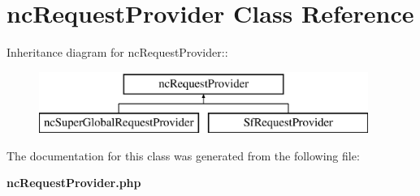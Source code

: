 \section{ncRequestProvider Class Reference}
\label{classncRequestProvider}
Inheritance diagram for ncRequestProvider::\begin{figure}[H]
\begin{center}
\leavevmode
\includegraphics[height=2cm]{classncRequestProvider}
\end{center}
\end{figure}


The documentation for this class was generated from the following file:\begin{CompactItemize}
\item 
{\bf ncRequestProvider.php}\end{CompactItemize}
